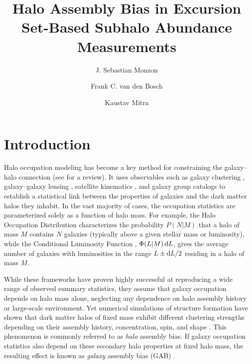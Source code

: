 \documentclass[twocolumn,apj,numberedappendix,twocolappendix,iop]{openjournal}
\begin{document}
\title{Halo Assembly Bias in Excursion Set-Based Subhalo Abundance Measurements}


\author{J. Sebastian Monzon}
\author{Frank C. van den Bosch}
\author{Kaustav Mitra}


\begin{abstract}

\end{abstract}

\section{Introduction}
\label{sec:intro}

Halo occupation modeling has become a key method for constraining the galaxy--halo connection (see \citealt{Wechsler.Tinker.18} for a review). It uses observables such as galaxy clustering \citep[][]{Berlind.Weinberg.02, vdBosch.etal.07, Zehavi.etal.11}, galaxy--galaxy lensing \citep{Mandelbaum.etal.06, Cacciato.etal.13, Leauthaud.etal.17}, satellite kinematics \citep{More.etal.09b, Lange.etal.19a, Mitra.etal.24}, and galaxy group catalogs \citep{Weinmann.etal.06, Yang.etal.07, Tinker.etal.12} to establish a statistical link between the properties of galaxies and the dark matter halos they inhabit. In the vast majority of cases, the occupation statistics are parameterized solely as a function of halo mass. For example, the Halo Occupation Distribution \citep[HOD;][]{Berlind.etal.03, Zheng.etal.05} characterizes the probability $P(N|M)$ that a halo of mass $M$ contains $N$ galaxies (typically above a given stellar mass or luminosity), while the Conditional Luminosity Function \citep[CLF;][]{Yang.etal.03, vdBosch.etal.13}, $\Phi(L|M)\,{\rm d}L$, gives the average number of galaxies with luminosities in the range $L \pm {\rm d}L/2$ residing in a halo of mass $M$.

While these frameworks have proven highly successful at reproducing a wide range of observed summary statistics, they assume that galaxy occupation depends on halo mass alone, neglecting any dependence on halo assembly history or large-scale environment. Yet numerical simulations of structure formation have shown that dark matter halos of fixed mass exhibit different clustering strengths depending on their assembly history, concentration, spin, and shape \citep{Gao.etal.05, Wechsler.etal.06, Gao.White.07, Dalal.etal.08, Giocoli.etal.10, Faltenbacher.White.10, Mao.etal.18, Paranjape.etal.18}. This phenomenon is commonly referred to as \textit{halo} assembly bias. If galaxy occupation statistics also depend on these secondary halo properties at fixed halo mass, the resulting effect is known as \textit{galaxy} assembly bias (GAB) \citep[][]{Zentner.etal.14}.
\end{document}
